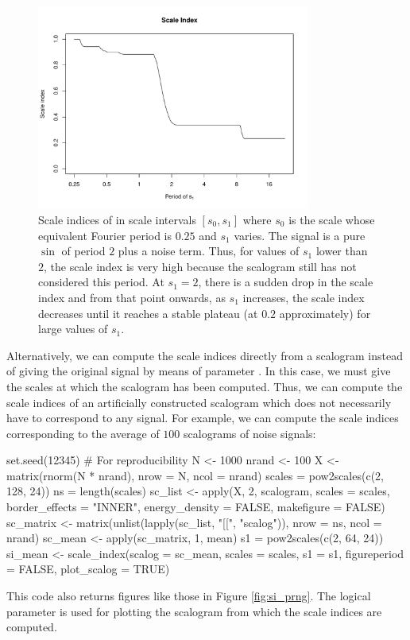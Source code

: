 \begin{figure}[tbp]
\begin{center}
  \includegraphics[width=0.8\textwidth]{Figure8}
\end{center}
\caption{Scale indices of  in scale intervals $\left[ s_0,s_1\right] $ where $s_0$ is the scale whose equivalent Fourier period is $0.25$ and $s_1$ varies. The signal is a pure $\sin $ of period $2$ plus a noise term. Thus, for values of $s_1$ lower than $2$, the scale index is very high because the scalogram still has not considered this period. At $s_1=2$, there is a sudden drop in the scale index and from that point onwards, as $s_1$ increases, the scale index decreases until it reaches a stable plateau (at $0.2$ approximately) for large values of $s_1$.}
\label{fig:sidx}
\end{figure}

Alternatively, we can compute the scale indices directly from a scalogram instead of giving the original signal by means of parameter . In this case, we must give the scales at which the scalogram has been computed. Thus, we can compute the scale indices of an artificially constructed scalogram which does not necessarily have to correspond to any signal. For example, we can compute the scale indices corresponding to the average of $100$ scalograms of noise signals:
\begin{example}
set.seed(12345) # For reproducibility
N <- 1000
nrand <- 100
X <- matrix(rnorm(N * nrand), nrow = N, ncol = nrand)
scales = pow2scales(c(2, 128, 24))
ns = length(scales)
sc_list <- apply(X, 2, scalogram, scales = scales, border_effects = "INNER",
                 energy_density = FALSE, makefigure = FALSE)
sc_matrix <- matrix(unlist(lapply(sc_list, "[[", "scalog")),
                    nrow = ns, ncol = nrand)
sc_mean <- apply(sc_matrix, 1, mean)
s1 = pow2scales(c(2, 64, 24))
si_mean <- scale_index(scalog = sc_mean, scales = scales, s1 = s1,
                       figureperiod = FALSE, plot_scalog = TRUE)
\end{example}
This code also returns figures like those in Figure \ref{fig:si_prng}. The logical parameter  is used for plotting the scalogram from which the scale indices are computed.

